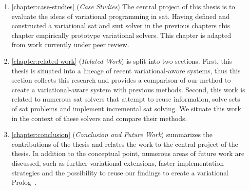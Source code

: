 \begin{enumerate}
  \item \autoref{chapter:case-studies} (\emph{Case Studies}) The central project
    of this thesis is to evaluate the ideas of variational programming in
    \acl{sat}. Having defined and constructed a variational \ac{sat} and
    \ac{smt} solver in the previous chapters this chapter empirically prototype
    variational solvers. This chapter is adapted from work currently under peer
    review.

  \item \autoref{chapter:related-work} (\emph{Related Work}) is split into two
    sections. First, this thesis is situated into a lineage of recent
    variational-aware systems, thus this section collects this research and
    provides a comparison of our method to create a variational-aware system
    with previous methods. Second, this work is related to numerous \ac{sat}
    solvers that attempt to reuse information, solve sets of \ac{sat} problems
    and implement incremental \ac{sat} solving. We situate this work in the
    context of these solvers and compare their methods.

  \item \autoref{chapter:conclusion} (\emph{Conclusion and Future Work})
    summarizes the contributions of the thesis and relates the work to the
    central project of the thesis. In addition to the conceptual point, numerous
    areas of future work are discussed, such as further variational extensions,
    faster implementation strategies and the possibility to reuse our findings
    to create a variational
    Prolog~\cite{wielemaker:2011:tplp,EarlyLogicProgramming}.
  \end{enumerate}




